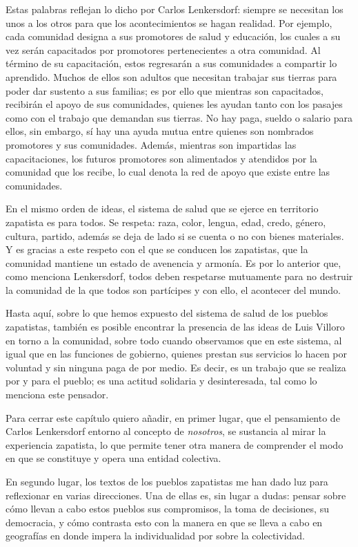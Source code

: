 \documentclass[oneside]{book}
\begin{document}
Estas palabras reflejan lo dicho por Carlos Lenkersdorf: siempre se necesitan los unos a los otros para que los acontecimientos se hagan realidad. Por ejemplo, cada comunidad designa a sus promotores de salud y educación, los cuales a su vez serán capacitados por promotores pertenecientes a otra comunidad. Al término de su capacitación, estos regresarán a sus comunidades a compartir lo aprendido. Muchos de ellos son adultos que necesitan trabajar sus tierras para poder dar sustento a sus familias; es por ello que mientras son capacitados, recibirán el apoyo de sus comunidades, quienes les ayudan tanto con los pasajes como con el trabajo que demandan sus tierras. No hay paga, sueldo o salario para ellos, sin embargo, sí hay una ayuda mutua entre quienes son nombrados promotores y sus comunidades. Además, mientras son impartidas las capacitaciones, los futuros promotores son alimentados y atendidos por la comunidad que los recibe, lo cual denota la red de apoyo que existe entre las comunidades.

En el mismo orden de ideas, el sistema de salud que se ejerce en territorio zapatista es para todos. Se respeta: raza, color, lengua, edad, credo, género, cultura, partido, además se deja de lado si se cuenta o no con bienes materiales. Y es gracias a este respeto con el que se conducen los zapatistas, que la comunidad mantiene un estado de avenencia y armonía. Es por lo anterior que, como menciona Lenkersdorf, todos deben respetarse mutuamente para no destruir la comunidad de la que todos son partícipes y con ello, el acontecer del mundo.

Hasta aquí, sobre lo que hemos expuesto del sistema de salud de los pueblos zapatistas, también es posible encontrar la presencia de las ideas de Luis Villoro en torno a la comunidad, sobre todo cuando observamos que en este sistema, al igual que en las funciones de gobierno, quienes prestan sus servicios lo hacen por voluntad y sin ninguna paga de por medio. Es decir, es un trabajo que se realiza por y para el pueblo; es una actitud solidaria y desinteresada, tal como lo menciona este pensador.

Para cerrar este capítulo quiero añadir, en primer lugar, que el pensamiento de Carlos Lenkersdorf entorno al concepto de \textit{nosotros}, se sustancia al mirar la experiencia zapatista, lo que permite tener otra manera de comprender el modo en que se constituye y opera una entidad colectiva.

En segundo lugar, los textos de los pueblos zapatistas me han dado luz para reflexionar en varias direcciones. Una de ellas es, sin lugar a dudas: pensar sobre cómo llevan a cabo estos pueblos sus compromisos, la toma de decisiones, su democracia, y cómo contrasta esto con la manera en que se lleva a cabo en geografías en donde impera la individualidad por sobre la colectividad.
\end{document}
